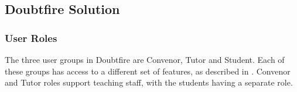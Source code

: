 
\subsection{Doubtfire Solution} %
\label{sub:doubtfire_solution}

\subsubsection{User Roles} %
\label{sub:user_roles}

The three user groups in Doubtfire are Convenor, Tutor and Student. Each of these groups has access to a different set of features, as described in . Convenor and Tutor roles support teaching staff, with the students having a separate role. 

